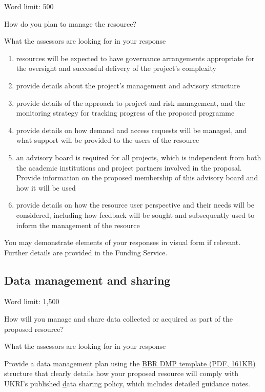 \documentclass[12in]{article}
\begin{document}
{\color{red}

Word limit: 500

How do you plan to manage the resource?

What the assessors are looking for in your response

\begin{enumerate}

	\item resources will be expected to have governance arrangements appropriate for
the oversight and successful delivery of the project’s complexity
	\item provide details about the project’s management and advisory structure
	\item provide details of the approach to project and risk management, and the
monitoring strategy for tracking progress of the proposed programme
	\item provide details on how demand and access requests will be managed, and
what support will be provided to the users of the resource
	\item an advisory board is required for all projects, which is independent from both
the academic institutions and project partners involved in the proposal.
Provide information on the proposed membership of this advisory board and
how it will be used
	\item provide details on how the resource user perspective and their needs will be
considered, including how feedback will be sought and subsequently used to
inform the management of the resource

\end{enumerate}

You may demonstrate elements of your responses in visual form if relevant.
Further details are provided in the Funding Service.
}

\pagebreak

\subsection{Data management and sharing}

{\color{red}

Word limit: 1,500

How will you manage and share data collected or acquired as part of the
proposed resource?

What the assessors are looking for in your response

Provide a data management plan using the \href{https://www.ukri.org/wp-content/uploads/2024/03/BBSRC-110324-Funding-Opp-BioinformaticsBiologicalResourcesFund-DataManagementPlanTemplate.pdf}{BBR DMP template (PDF, 161KB)}
structure that clearly details how your proposed resource will comply with
UKRI’s published \href{https://www.ukri.org/manage-your-award/publishing-your-research-findings/making-your-research-data-open/} data sharing policy, which includes detailed guidance notes.

}
\end{document}
